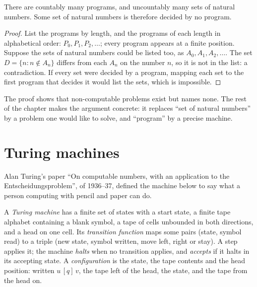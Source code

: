 \begin{theorem}\label{thm:b3:computability:uncountable}
There are countably many programs, and uncountably many sets of natural numbers. Some set of natural numbers is therefore decided by no program.
\end{theorem}

\begin{proof}
List the programs by length, and the programs of each length in alphabetical order: $P_0, P_1, P_2, \ldots$; every program appears at a finite position. Suppose the sets of natural numbers could be listed too, as $A_0, A_1, A_2, \ldots$. The set $D = \{n : n \notin A_n\}$ differs from each $A_n$ on the number $n$, so it is not in the list: a contradiction. If every set were decided by a program, mapping each set to the first program that decides it would list the sets, which is impossible.
\end{proof}

The proof shows that non-computable problems exist but names none. The rest of the chapter makes the argument concrete: it replaces ``set of natural numbers'' by a problem one would like to solve, and ``program'' by a precise machine.

\section{Turing machines}\label{sec:b3:computability:tm}

Alan Turing's paper ``On computable numbers, with an application to the Entscheidungsproblem'', of 1936--37, defined the machine below to say what a person computing with pencil and paper can do. %

\begin{definition}\label{def:b3:computability:tm}
A \emph{Turing machine} has a finite set of states with a start state, a finite tape alphabet containing a blank symbol, a tape of cells unbounded in both directions, and a head on one cell. Its \emph{transition function} maps some pairs (state, symbol read) to a triple (new state, symbol written, move left, right or stay). A step applies it; the machine \emph{halts} when no transition applies, and \emph{accepts} if it halts in its accepting state. A \emph{configuration} is the state, the tape contents and the head position: written $u\,[q]\,v$, the tape left of the head, the state, and the tape from the head on.
\end{definition}

